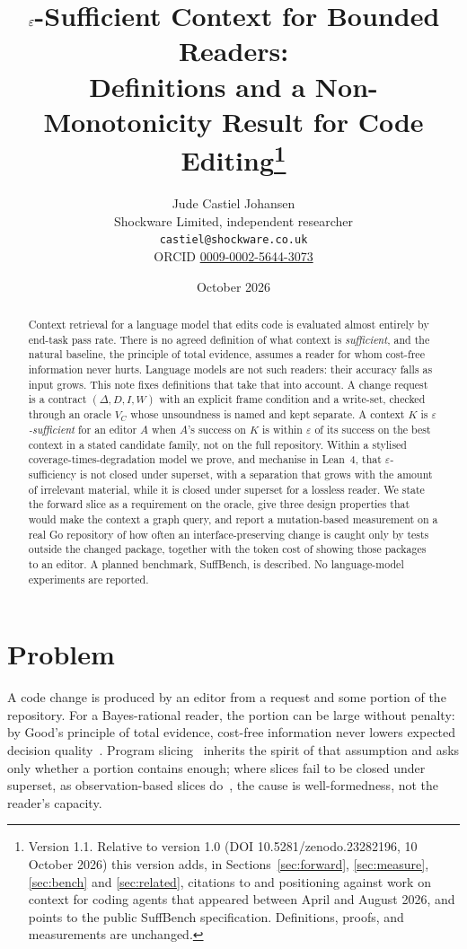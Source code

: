 \documentclass[10pt]{article}
\title{$\eps$-Sufficient Context for Bounded Readers:\\ Definitions and a Non-Monotonicity Result for Code Editing\thanks{Version 1.1. Relative to version 1.0 (DOI 10.5281/zenodo.23282196, 10 October 2026) this version adds, in Sections~\ref{sec:forward}, \ref{sec:measure}, \ref{sec:bench} and \ref{sec:related}, citations to and positioning against work on context for coding agents that appeared between April and August 2026, and points to the public SuffBench specification. Definitions, proofs, and measurements are unchanged.}}
\author{Jude Castiel Johansen\\ Shockware Limited, independent researcher\\ \texttt{castiel@shockware.co.uk}\\ ORCID \href{https://orcid.org/0009-0002-5644-3073}{0009-0002-5644-3073}}
\date{October 2026}
\theoremstyle{definition}
\theoremstyle{plain}
\theoremstyle{remark}
\newcommand{\eps}{\varepsilon}
\begin{document}
\maketitle

\begin{abstract}
Context retrieval for a language model that edits code is evaluated almost entirely by end-task pass rate. There is no agreed definition of what context is \emph{sufficient}, and the natural baseline, the principle of total evidence, assumes a reader for whom cost-free information never hurts. Language models are not such readers: their accuracy falls as input grows. This note fixes definitions that take that into account. A change request is a contract $(\Delta, D, I, W)$ with an explicit frame condition and a write-set, checked through an oracle $V_C$ whose unsoundness is named and kept separate. A context $K$ is \emph{$\eps$-sufficient} for an editor $A$ when $A$'s success on $K$ is within $\eps$ of its success on the best context in a stated candidate family, not on the full repository. Within a stylised coverage-times-degradation model we prove, and mechanise in Lean~4, that $\eps$-sufficiency is not closed under superset, with a separation that grows with the amount of irrelevant material, while it is closed under superset for a lossless reader. We state the forward slice as a requirement on the oracle, give three design properties that would make the context a graph query, and report a mutation-based measurement on a real Go repository of how often an interface-preserving change is caught only by tests outside the changed package, together with the token cost of showing those packages to an editor. A planned benchmark, SuffBench, is described. No language-model experiments are reported.
\end{abstract}

\section{Problem}

A code change is produced by an editor from a request and some portion of the repository. For a Bayes-rational reader, the portion can be large without penalty: by Good's principle of total evidence, cost-free information never lowers expected decision quality~\cite{good1967total,blackwell1953equivalent}. Program slicing~\cite{weiser1984,horwitz1990} inherits the spirit of that assumption and asks only whether a portion contains enough; where slices fail to be closed under superset, as observation-based slices do~\cite{binkley2014orbs}, the cause is well-formedness, not the reader's capacity.
\end{document}
